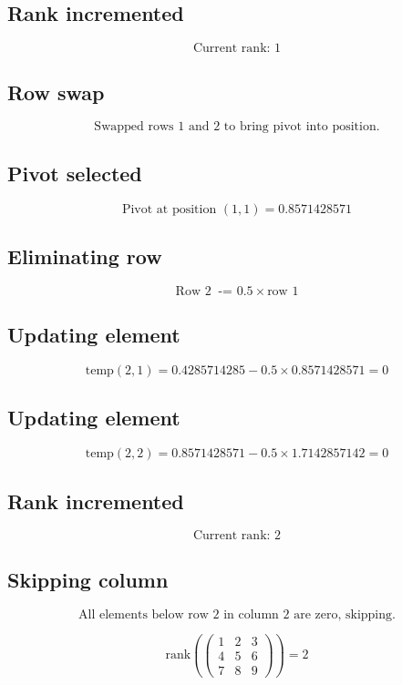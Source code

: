 \documentclass{article}
\begin{document}
\subsection*{ \vspace{1em} Rank incremented}
\[
\text{Current rank: } 1
\]
\subsection*{ \vspace{1em} Row swap}
\[
\text{Swapped rows } 1 \text{ and } 2 \text{ to bring pivot into position.}
\]
\subsection*{ \vspace{1em} Pivot selected}
\[
\text{Pivot at position } ( 1,1 ) = 0.8571428571
\]
\subsection*{ \vspace{1em} Eliminating row}
\[
\text{Row } 2\ \text{ -= } 0.5 \times \text{row } 1
\]
\subsection*{ \vspace{1em} Updating element}
\[
\text{temp}( 2,1 ) = 0.4285714285 - 0.5 \times 0.8571428571 = 0
\]
\subsection*{ \vspace{1em} Updating element}
\[
\text{temp}( 2,2 ) = 0.8571428571 - 0.5 \times 1.7142857142 = 0
\]
\subsection*{ \vspace{1em} Rank incremented}
\[
\text{Current rank: } 2
\]
\subsection*{ \vspace{1em} Skipping column}
\[
\text{All elements below row } 2 \text{ in column } 2 \text{ are zero, skipping.}
\]
\medskip

\[
\text{rank}(\begin{pmatrix}1 & 2 & 3 \\ 4 & 5 & 6 \\ 7 & 8 & 9\end{pmatrix}) = 2
\]
\bigskip
\end{document}

